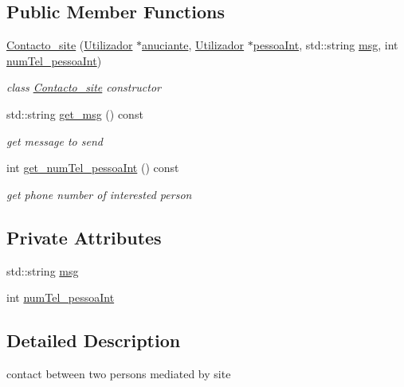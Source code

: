 \subsection*{Public Member Functions}
\begin{DoxyCompactItemize}
\item 
\hyperlink{class_contacto__site_a7e34c8ad169628ea0ccf3f063e535624}{Contacto\+\_\+site} (\hyperlink{class_utilizador}{Utilizador} $\ast$\hyperlink{class_contacto_ad020f8ee61dfb535c9b8b253adf455e7}{anuciante}, \hyperlink{class_utilizador}{Utilizador} $\ast$\hyperlink{class_contacto_a30bc3e0baecefc67118e591858b5da4c}{pessoa\+Int}, std\+::string \hyperlink{class_contacto__site_a253097082e8f37b7a6c1cf96d35b6495}{msg}, int \hyperlink{class_contacto__site_adbd1a7cc4a59b518abd34366163f7983}{num\+Tel\+\_\+pessoa\+Int})
\begin{DoxyCompactList}\small\item\em class \hyperlink{class_contacto__site}{Contacto\+\_\+site} constructor \end{DoxyCompactList}\item 
std\+::string \hyperlink{class_contacto__site_a2ca062f68d723c4d72dbc62ae7ca3ab3}{get\+\_\+msg} () const 
\begin{DoxyCompactList}\small\item\em get message to send \end{DoxyCompactList}\item 
int \hyperlink{class_contacto__site_a0df80a69ea611279dde431160d14d311}{get\+\_\+num\+Tel\+\_\+pessoa\+Int} () const 
\begin{DoxyCompactList}\small\item\em get phone number of interested person \end{DoxyCompactList}\end{DoxyCompactItemize}
\subsection*{Private Attributes}
\begin{DoxyCompactItemize}
\item 
std\+::string \hyperlink{class_contacto__site_a253097082e8f37b7a6c1cf96d35b6495}{msg}
\item 
int \hyperlink{class_contacto__site_adbd1a7cc4a59b518abd34366163f7983}{num\+Tel\+\_\+pessoa\+Int}
\end{DoxyCompactItemize}


\subsection{Detailed Description}
contact between two persons mediated by site 

